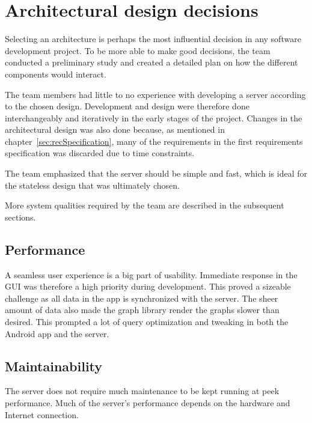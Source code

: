 \section{Architectural design decisions}
Selecting an architecture is perhaps the most influential decision in any software development project. To be more able to make good decisions, the team conducted a preliminary study and created a detailed plan on how the different components would interact. 

The team members had little to no experience with developing a server according to the chosen design. Development and design were therefore done interchangeably and iteratively in the early stages of the project. Changes in the architectural design was also done because, as mentioned in chapter~\ref{sec:recSpecification}, many of the requirements in the first requirements specification was discarded due to time constraints.

The team emphasized that the server should be simple and fast, which is ideal for the stateless design that was ultimately chosen. 



More system qualities required by the team are described in the subsequent sections.

\subsection{Performance}
A seamless user experience is a big part of usability. Immediate response in the GUI was therefore a high priority during development. This proved a sizeable challenge as all data in the app is synchronized with the server. 
The sheer amount of data also made the graph library render the graphs slower than desired. This prompted a lot of query optimization and tweaking in both the Android app and the server. 

\subsection{Maintainability}
The server does not require much maintenance to be kept running at peek performance. Much of the server's performance depends on the hardware and Internet connection. 

